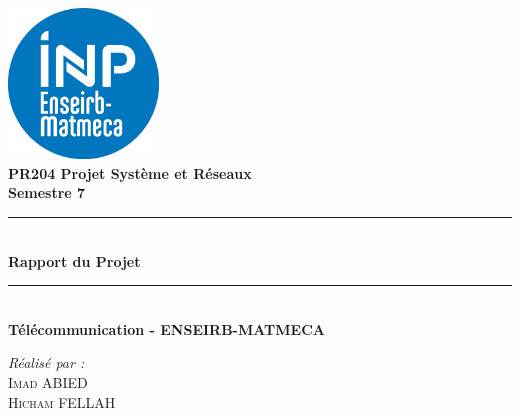 \documentclass[12pt]{article}
\begin{document}

\begin{titlepage}

\begin{center}
  
  \includegraphics[width=0.3\textwidth]{logos.jpg}\\[1.5cm]
  {\Large \bfseries PR204 Projet Système et Réseaux\\[0.5cm] Semestre 7}\\[1.5cm]
  
  \rule{\linewidth}{0.5mm} \\[0.4cm]
  { \huge \bfseries Rapport du Projet\\[0.4cm] }
  \rule{\linewidth}{0.5mm} \\[1cm]

  {\Large \bfseries Télécommunication - ENSEIRB-MATMECA}\\[4cm]


\begin{minipage}{0.8\textwidth}
\begin{center}
      \large
    \emph{Réalisé par :} \\[0.3cm]
    \textsc{Imad ABIED}\\
    \textsc{Hicham FELLAH}\\

\end{center}
\end{minipage}
\end{center}

\end{titlepage}

\end{document}
